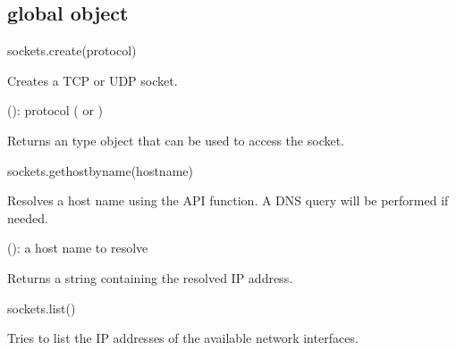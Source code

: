 \documentclass[a4paper,12pt,twoside,extrafontsizes]{memoir}
\begin{document}
\subsection{ global object}


\begin{luafuncprototype}
	sockets.create(protocol)
\end{luafuncprototype}

\begin{funcdescr}
	Creates a TCP or UDP socket.
\end{funcdescr}

\begin{funcparams}
	 (): protocol ( or )
\end{funcparams}

\begin{funcret}
	Returns an  type object that can be used to access the socket.
\end{funcret}


\begin{luafuncprototype}
	sockets.gethostbyname(hostname)
\end{luafuncprototype}

\begin{funcdescr}
	Resolves a host name using the  API function. A DNS query will be performed if needed.
\end{funcdescr}

\begin{funcparams}
	 (): a host name to resolve
\end{funcparams}

\begin{funcret}
	Returns a string containing the resolved IP address.
\end{funcret}


\begin{luafuncprototype}
	sockets.list()
\end{luafuncprototype}

\begin{funcdescr}
	Tries to list the IP addresses of the available network interfaces.
\end{funcdescr}
\end{document}
